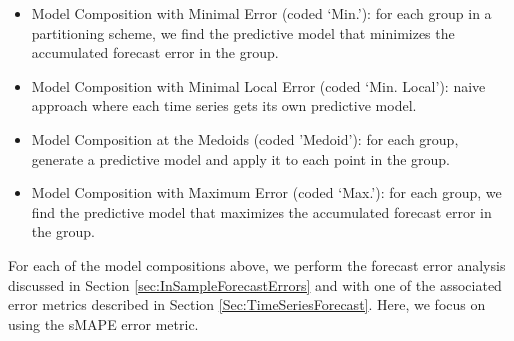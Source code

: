 \begin{itemize}%
	\item Model Composition with Minimal Error (coded `Min.'): for each group in a partitioning scheme, we find the predictive model that minimizes the accumulated forecast error in the group. %
	\item Model Composition with Minimal Local Error (coded `Min. Local'): naive approach where each time series gets its own predictive model. %
	\item Model Composition at the Medoids (coded 'Medoid'): for each group, generate a predictive model and apply it to each point in the group.%
	\item Model Composition with Maximum Error (coded `Max.'): for each group, we find the predictive model that maximizes the accumulated forecast error in the group.%
\end{itemize}

For each of the model compositions above, we perform the forecast error analysis discussed in Section \ref{sec:InSampleForecastErrors} and with one of the associated error metrics described in Section \ref{Sec:TimeSeriesForecast}. Here, we focus on using the sMAPE error metric.

